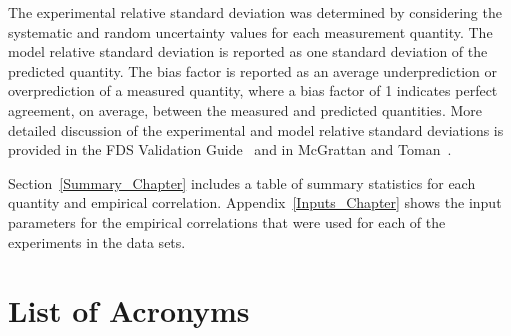 \documentclass[11pt]{book}
\begin{document}
The experimental relative standard deviation was determined by considering the systematic and random uncertainty values for each measurement quantity. The model relative standard deviation is reported as one standard deviation of the predicted quantity. The bias factor is reported as an average underprediction or overprediction of a measured quantity, where a bias factor of 1 indicates perfect agreement, on average, between the measured and predicted quantities. More detailed discussion of the experimental and model relative standard deviations is provided in the FDS Validation Guide~\cite{FDS_Validation_Guide} and in McGrattan and Toman~\cite{McGrattan:Metrologia}.

Section~\ref{Summary_Chapter} includes a table of summary statistics for each quantity and empirical correlation. Appendix~\ref{Inputs_Chapter} shows the input parameters for the empirical correlations that were used for each of the experiments in the data sets.

\cleardoublepage
{}
{}
\tableofcontents

\cleardoublepage
{}
{}
\listoffigures

\cleardoublepage
{}
{}
\listoftables

\chapter{List of Acronyms}
\end{document}
